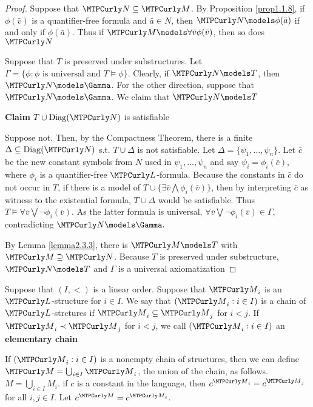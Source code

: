 \documentclass[11pt]{article}
\begin{document}
\begin{proof}
Suppose that \(\caln\subseteq\calm\). By Proposition \ref{prop1.1.8}, if
\(\phi(\bar{v})\) is a quantifier-free formula and \(\bar{a}\in N\), then
\(\caln\models\phi(\bar{a})\) if and only if \(\phi(\bar{a})\). Thus if
\(\calm\models\forall\bar{v}\phi(\bar{v})\), then so does \(\caln\)

Suppose that \(T\) is preserved under substructures. Let
\(\Gamma=\{\phi:\phi\text{ is universal and }T\models\phi\}\). Clearly, if
\(\caln\models T\), then \(\caln\models\Gamma\). For the other direction,
suppose that \(\caln\models\Gamma\). We claim that \(\caln\models T\)

\textbf{Claim} \(T\cup\Diag(\caln)\) is satisfiable

Suppose not. Then, by the Compactness Theorem, there is a finite
\(\Delta\subseteq\Diag(\caln)\) s.t. \(T\cup\Delta\) is not satisfiable. Let
\(\Delta=\{\psi_1,\dots,\psi_n\}\). Let \(\bar{c}\) be the new constant
symbols from \(N\) used in \(\psi_1,\dots,\psi_n\) and say
\(\psi_i=\phi_i(\bar{c})\), where \(\phi_i\) is a quantifier-free
\(\call\)-formula. Because the constants in \(\bar{c}\) do not occur in \(T\), if
there is a model of \(T\cup\{\exists\bar{v}\bigwedge\phi_i(\bar{v})\}\), then
by interpreting \(\bar{c}\) as witness to the existential formula,
\(T\cup\Delta\) would be satisfiable. Thus
\(T\models\forall\bar{v}\bigvee\neg\phi_i(\bar{v})\). As the latter formula
is universal, \(\forall\bar{v}\bigvee\neg\phi_i(\bar{v})\in\Gamma\),
contradicting \(\caln\models\Gamma.\)

By Lemma \ref{lemma2.3.3}, there is \(\calm\models T\) with
\(\calm\supseteq\caln\). Because \(T\) is preserved under substructure,
\(\caln\models T\) and \(\Gamma\) is a universal axiomatization
\end{proof}

\begin{definition}[]
Suppose that \((I,<)\) is a linear order. Suppose that \(\calm_i\) is an
\(\call\)-structure for \(i\in I\). We say that \((\calm_i:i\in I)\) is a
chain of \(\call\)-strctures if \(\calm_i\subseteq\calm_j\) for \(i<j\). If
\(\calm_i\prec\calm_j\) for \(i<j\), we call \((\calm_i:i\in I)\) an 
\textbf{elementary chain}
\end{definition}

If \((\calm_i:i\in I)\) is a nonempty chain of structures, then we can define
\(\calm=\bigcup_{i\in I}\calm_i\), the union of the chain, as follows. 
\(M=\bigcup_{i\in I}M_i\). if \(c\) is a constant in the language, then
\(c^{\calm_i}=c^{\calm_j}\) for all \(i,j\in I\). Let
\(c^\calm=c^{\calm_i}\).
\end{document}
